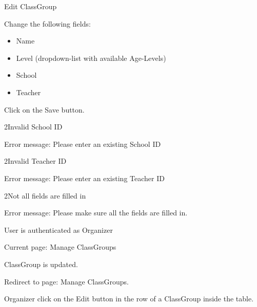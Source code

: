 
\begin{uc}{Edit ClassGroup}


    \begin{uc-mss}
    \item Change the following fields:
    	\begin{itemize}
			\item Name
			\item Level (dropdown-list with available Age-Levels)
			\item School
			\item Teacher
		\end{itemize}
    \item Click on the Save button.
    \end{uc-mss}

    \begin{uc-ext}

        \begin{uc-fail}{2}{Invalid School ID}
        \item Error message: Please enter an existing School ID
        \end{uc-fail}
        
        \begin{uc-fail}{2}{Invalid Teacher ID}
        \item Error message: Please enter an existing Teacher ID
        \end{uc-fail}
        
        \begin{uc-fail}{2}{Not all fields are filled in}
        \item Error message: Please make sure all the fields are filled in.
        \end{uc-fail}

    \end{uc-ext}

    \begin{uc-pre}
    \item User is authenticated as Organizer
    \item Current page: Manage ClassGroups
    \end{uc-pre}

    \begin{uc-post}
    \item ClassGroup is updated.
    \item Redirect to page: Manage ClassGroups.
    \end{uc-post}

    \begin{uc-trig}
        Organizer click on the Edit button in the row of a ClassGroup inside the table.
    \end{uc-trig}

\end{uc}
